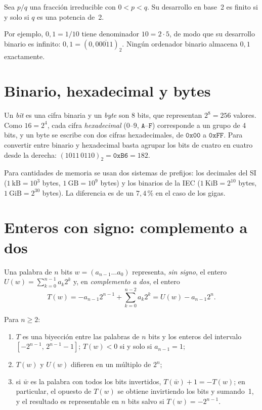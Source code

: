 \begin{proposicion}\label{prop:fraccion-binaria}
Sea $p/q$ una fracción irreducible con $0<p<q$. Su desarrollo en base~2 es finito si y solo si $q$ es una potencia de~2.
\end{proposicion}

Por ejemplo, $0{,}1=1/10$ tiene denominador $10=2\cdot5$, de modo que su desarrollo binario es infinito: $0{,}1=(0{,}0\overline{0011})_2$. Ningún ordenador binario almacena $0{,}1$ exactamente.

\section{Binario, hexadecimal y bytes}

Un \emph{bit} es una cifra binaria y un \emph{byte} son 8 bits, que representan $2^8=256$ valores. Como $16=2^4$, cada cifra \emph{hexadecimal} ($0$--$9$, $\texttt{A}$--$\texttt{F}$) corresponde a un grupo de 4 bits, y un byte se escribe con dos cifras hexadecimales, de $\texttt{0x00}$ a $\texttt{0xFF}$. Para convertir entre binario y hexadecimal basta agrupar los bits de cuatro en cuatro desde la derecha: $(1011\,0110)_2=\texttt{0xB6}=182$.

Para cantidades de memoria se usan dos sistemas de prefijos: los decimales del SI ($1\ \text{kB}=10^3$ bytes, $1\ \text{GB}=10^9$ bytes) y los binarios de la IEC ($1\ \text{KiB}=2^{10}$ bytes, $1\ \text{GiB}=2^{30}$ bytes). La diferencia es de un $7{,}4\,\%$ en el caso de los gigas.

\section{Enteros con signo: complemento a dos}

\begin{definicion}\label{def:c2}
Una palabra de $n$ bits $w=(a_{n-1}\dots a_0)$ representa, \emph{sin signo}, el entero $U(w)=\sum_{k=0}^{n-1}a_k2^k$ y, en \emph{complemento a dos}, el entero
\[
T(w)=-a_{n-1}2^{n-1}+\sum_{k=0}^{n-2}a_k2^k=U(w)-a_{n-1}2^n.
\]
\end{definicion}

\begin{teorema}\label{teo:c2}
Para $n\ge2$:
\begin{enumerate}
  \item $T$ es una biyección entre las palabras de $n$ bits y los enteros del intervalo $[-2^{n-1},\,2^{n-1}-1]$; $T(w)<0$ si y solo si $a_{n-1}=1$;
  \item $T(w)$ y $U(w)$ difieren en un múltiplo de $2^n$;
  \item si $\bar w$ es la palabra con todos los bits invertidos, $T(\bar w)+1=-T(w)$; en particular, el opuesto de $T(w)$ se obtiene invirtiendo los bits y sumando~1, y el resultado es representable en $n$ bits salvo si $T(w)=-2^{n-1}$.
\end{enumerate}
\end{teorema}

